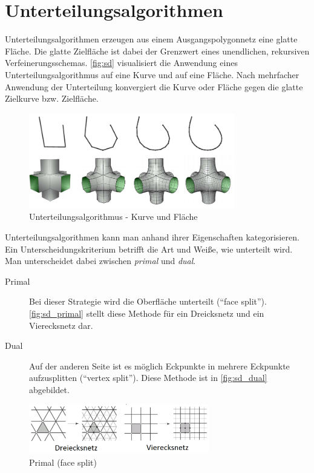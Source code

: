 \section{Unterteilungsalgorithmen}

Unterteilungsalgorithmen erzeugen aus einem Ausgangspolygonnetz eine glatte Fläche.
Die glatte Zielfläche ist dabei der Grenzwert eines unendlichen, rekursiven Verfeinerungsschemas.
\autoref{fig:sd} visualisiert die Anwendung eines Unterteilungsalgorithmus auf eine Kurve und auf eine Fläche.
Nach mehrfacher Anwendung der Unterteilung konvergiert die Kurve oder Fläche gegen die glatte Zielkurve bzw. Zielfläche.

\begin{figure}
  \centering
  \includegraphics[width=0.8\textwidth]{content/media/sd.png}
  \caption{Unterteilungsalgorithmus - Kurve und Fläche \cite{Standford.24.07.2015}}
  \label{fig:sd}
\end{figure}

Unterteilungsalgorithmen kann man anhand ihrer Eigenschaften kategorisieren.
Ein Unterscheidungskriterium betrifft die Art und Weiße, wie unterteilt wird.
Man unterscheidet dabei zwischen \emph{primal} und \emph{dual}.

\begin{description}
 \item[Primal] Bei dieser Strategie wird die Oberfläche unterteilt (\enquote{face split}).
\autoref{fig:sd_primal} stellt diese Methode für ein Dreicksnetz und ein Vierecksnetz dar.
 \item[Dual] Auf der anderen Seite ist es möglich Eckpunkte in mehrere Eckpunkte aufzusplitten (\enquote{vertex split}).
 Diese Methode ist in \autoref{fig:sd_dual} abgebildet.

\end{description}
\begin{figure}
  \centering
  \includegraphics[width=0.7\textwidth]{content/media/sd_primal}
  \caption{Primal (face split) \cite{Standford.24.07.2015}}
  \label{fig:sd_primal}
\end{figure}

